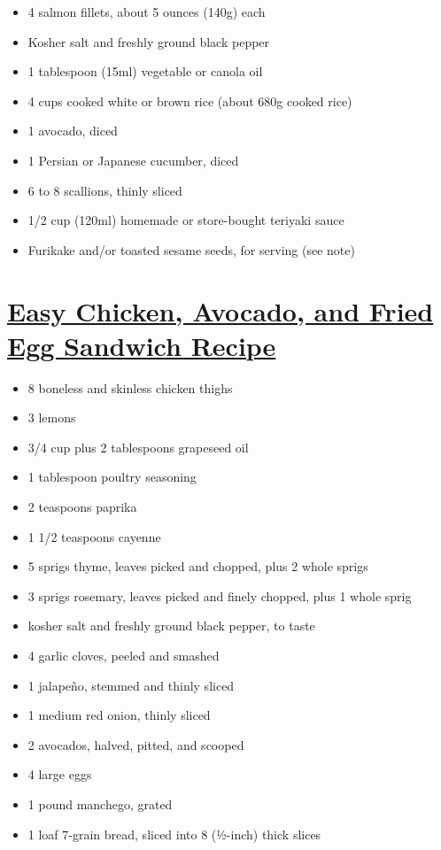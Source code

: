 \documentclass[
]{article}
\providecommand{\tightlist}{%
  \setlength{\itemsep}{0pt}\setlength{\parskip}{0pt}}
\begin{document}
\begin{itemize}
\tightlist
\item
  4 salmon fillets, about 5 ounces (140g) each
\item
  Kosher salt and freshly ground black pepper
\item
  1 tablespoon (15ml) vegetable or canola oil
\item
  4 cups cooked white or brown rice (about 680g cooked rice)
\item
  1 avocado, diced
\item
  1 Persian or Japanese cucumber, diced
\item
  6 to 8 scallions, thinly sliced
\item
  1/2 cup (120ml) homemade or store-bought teriyaki sauce
\item
  Furikake and/or toasted sesame seeds, for serving (see note)
\end{itemize}

\hypertarget{easy-chicken-avocado-and-fried-egg-sandwich-recipe}{%
\section{\texorpdfstring{\href{https://www.vice.com/en_us/article/gyam9j/easy-chicken-avocado-and-fried-egg-sandwich-recipe}{Easy Chicken, Avocado, and Fried Egg Sandwich Recipe}}{Easy Chicken, Avocado, and Fried Egg Sandwich Recipe}}\label{easy-chicken-avocado-and-fried-egg-sandwich-recipe}}

\begin{itemize}
\tightlist
\item
  8 boneless and skinless chicken thighs
\item
  3 lemons
\item
  3/4 cup plus 2 tablespoons grapeseed oil
\item
  1 tablespoon poultry seasoning
\item
  2 teaspoons paprika
\item
  1 1/2 teaspoons cayenne
\item
  5 sprigs thyme, leaves picked and chopped, plus 2 whole sprigs
\item
  3 sprigs rosemary, leaves picked and finely chopped, plus 1 whole sprig
\item
  kosher salt and freshly ground black pepper, to taste
\item
  4 garlic cloves, peeled and smashed
\item
  1 jalapeño, stemmed and thinly sliced
\item
  1 medium red onion, thinly sliced
\item
  2 avocados, halved, pitted, and scooped
\item
  4 large eggs
\item
  1 pound manchego, grated
\item
  1 loaf 7-grain bread, sliced into 8 (½-inch) thick slices
\end{itemize}
\end{document}
